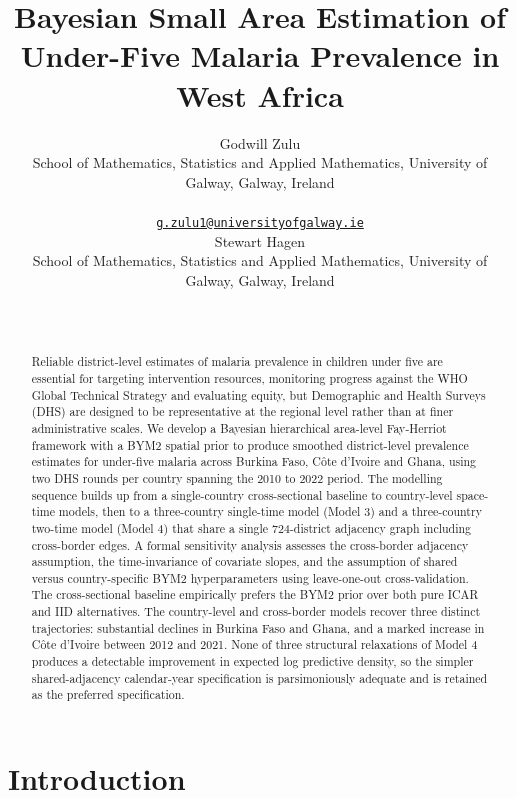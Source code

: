 \documentclass{article}
\title{Bayesian Small Area Estimation of Under-Five Malaria Prevalence
in West Africa}
\author{
    Godwill Zulu
   \\
    School of Mathematics, Statistics and Applied Mathematics,
University of Galway, Galway, Ireland \\
   \\
  \texttt{\href{mailto:g.zulu1@universityofgalway.ie}{\nolinkurl{g.zulu1@universityofgalway.ie}}} \\
   \And
    Stewart Hagen
   \\
    School of Mathematics, Statistics and Applied Mathematics,
University of Galway, Galway, Ireland \\
   \\
  \texttt{} \\
  }
\begin{document}
\maketitle


\begin{abstract}
Reliable district-level estimates of malaria prevalence in children
under five are essential for targeting intervention resources,
monitoring progress against the WHO Global Technical Strategy and
evaluating equity, but Demographic and Health Surveys (DHS) are designed
to be representative at the regional level rather than at finer
administrative scales. We develop a Bayesian hierarchical area-level
Fay-Herriot framework with a BYM2 spatial prior to produce smoothed
district-level prevalence estimates for under-five malaria across
Burkina Faso, Côte d'Ivoire and Ghana, using two DHS rounds per country
spanning the 2010 to 2022 period. The modelling sequence builds up from
a single-country cross-sectional baseline to country-level space-time
models, then to a three-country single-time model (Model 3) and a
three-country two-time model (Model 4) that share a single 724-district
adjacency graph including cross-border edges. A formal sensitivity
analysis assesses the cross-border adjacency assumption, the
time-invariance of covariate slopes, and the assumption of shared versus
country-specific BYM2 hyperparameters using leave-one-out
cross-validation. The cross-sectional baseline empirically prefers the
BYM2 prior over both pure ICAR and IID alternatives. The country-level
and cross-border models recover three distinct trajectories: substantial
declines in Burkina Faso and Ghana, and a marked increase in Côte
d'Ivoire between 2012 and 2021. None of three structural relaxations of
Model 4 produces a detectable improvement in expected log predictive
density, so the simpler shared-adjacency calendar-year specification is
parsimoniously adequate and is retained as the preferred specification.
\end{abstract}


\section{Introduction}\label{introduction}

\label{sec:intro}
\end{document}
